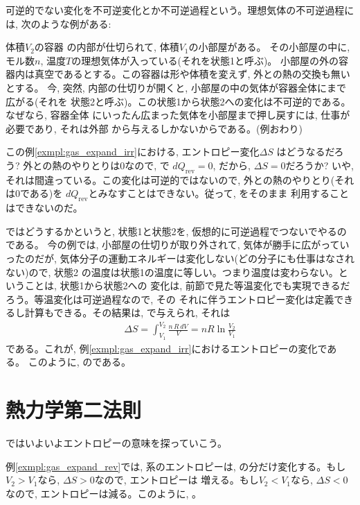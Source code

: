 可逆的でない変化を不可逆変化とか不可逆過程という。理想気体の不可逆過程には, 
次のような例がある:

\begin{exmpl}\label{exmpl:gas_expand_irr} 体積$V_2$の容器
の内部が仕切られて, 体積$V_1$の小部屋がある。
その小部屋の中に, モル数$n$, 温度$T$の理想気体が入っている(それを状態1と呼ぶ)。
小部屋の外の容器内は真空であるとする。この容器は形や体積を変えず, 外との熱の交換も無いとする。
今, 突然, 内部の仕切りが開くと, 小部屋の中の気体が容器全体にまで広がる(それを
状態2と呼ぶ)。この状態1から状態2への変化は不可逆的である。なぜなら, 容器全体
にいったん広まった気体を小部屋まで押し戻すには, 仕事が必要であり, それは外部
から与えるしかないからである。(例おわり)\end{exmpl}

この例\ref{exmpl:gas_expand_irr}における, エントロピー変化$\Delta S$
はどうなるだろう? 外との熱のやりとりは0なので, で
$dQ_{\text{rev}}=0$, だから, $\Delta S=0$だろうか? いや, 
それは間違っている。この変化は可逆的ではないので, 外との熱のやりとり(それは0である)を
$dQ_{\text{rev}}$とみなすことはできない。従って, をそのまま
利用することはできないのだ。

ではどうするかというと, 状態1と状態2を, 仮想的に可逆過程でつないでやるのである。
今の例では, 小部屋の仕切りが取り外されて, 気体が勝手に広がっていったのだが, 
気体分子の運動エネルギーは変化しない(どの分子にも仕事はなされない)ので, 状態2
の温度は状態1の温度に等しい。つまり温度は変わらない。ということは, 状態1から状態2への
変化は, 前節で見た等温変化でも実現できるだろう。等温変化は可逆過程なので, その
それに伴うエントロピー変化は定義できるし計算もできる。その結果は, 
で与えられ, それは
\begin{eqnarray}
\Delta S=\int_{V_1}^{V_2} \frac{n\,R\,dV}{V}=nR\ln\frac{V_2}{V_1}\label{eq:entropy_expand}
\end{eqnarray}
である。これが, 例\ref{exmpl:gas_expand_irr}におけるエントロピーの変化である。
このように, のである。\\

\section{熱力学第二法則}

ではいよいよエントロピーの意味を探っていこう。

例\ref{exmpl:gas_expand_rev}では, 系のエントロピーは, 
の分だけ変化する。もし$V_2>V_1$なら, $\Delta S>0$なので, エントロピーは
増える。もし$V_2<V_1$なら, $\Delta S<0$なので, エントロピーは減る。このように, 
。\\

